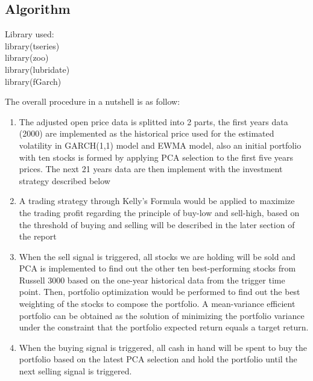 \documentclass[11pts]{article}
\begin{document}
\subsection{Algorithm}
\label{sec:org1a922c5}
Library used:\\
\indent library(tseries)\\
\indent library(zoo)\\
\indent library(lubridate)\\
\indent library(fGarch)

The overall procedure in a nutshell is as follow:

\begin{enumerate}
\item The adjusted open price data is splitted into 2 parts, the first years data (2000) are implemented as the historical price used for the estimated volatility in GARCH(1,1) model and EWMA model, also an initial portfolio with ten stocks is formed by applying PCA selection to the first five years prices. The next 21 years data are then implement with the investment strategy described below
\item A trading strategy through Kelly's Formula would be applied to maximize the trading profit regarding the principle of buy-low and sell-high, based on the threshold of buying and selling will be described in the later section of the report
\item When the sell signal is triggered, all stocks we are holding will be sold and PCA is implemented to find out the other ten best-performing stocks from Russell 3000 based on the one-year historical data from the trigger time point. Then, portfolio optimization would be performed to find out the best weighting of the stocks to compose the portfolio. A mean-variance efficient portfolio can be obtained as the solution of minimizing the portfolio variance under the constraint that the portfolio expected return equals a target return.
\item When the buying signal is triggered, all cash in hand will be spent to buy the portfolio based on the latest PCA selection and hold the portfolio until the next selling signal is triggered.
\end{enumerate}
\end{document}
